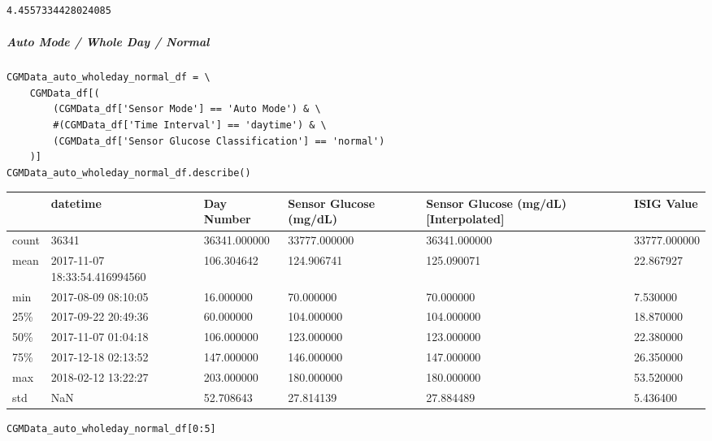 \begin{verbatim}
4.4557334428024085
\end{verbatim}

\subparagraph{Auto Mode / Whole Day / Normal}

\begin{verbatim}
CGMData_auto_wholeday_normal_df = \
    CGMData_df[(
        (CGMData_df['Sensor Mode'] == 'Auto Mode') & \
        #(CGMData_df['Time Interval'] == 'daytime') & \
        (CGMData_df['Sensor Glucose Classification'] == 'normal')
    )]
CGMData_auto_wholeday_normal_df.describe()
\end{verbatim}

\bigskip\noindent
\begin{tabular}{p{}p{}p{}p{}p{}p{}}
\toprule
 & datetime & Day Number & Sensor Glucose (mg/dL) & Sensor Glucose (mg/dL) [Interpolated] & ISIG Value \\
\hline
count & 36341 & 36341.000000 & 33777.000000 & 36341.000000 & 33777.000000 \\
\hline
mean & 2017-11-07 18:33:54.416994560 & 106.304642 & 124.906741 & 125.090071 & 22.867927 \\
\hline
min & 2017-08-09 08:10:05 & 16.000000 & 70.000000 & 70.000000 & 7.530000 \\
\hline
25\% & 2017-09-22 20:49:36 & 60.000000 & 104.000000 & 104.000000 & 18.870000 \\
\hline
50\% & 2017-11-07 01:04:18 & 106.000000 & 123.000000 & 123.000000 & 22.380000 \\
\hline
75\% & 2017-12-18 02:13:52 & 147.000000 & 146.000000 & 147.000000 & 26.350000 \\
\hline
max & 2018-02-12 13:22:27 & 203.000000 & 180.000000 & 180.000000 & 53.520000 \\
\hline
std & NaN & 52.708643 & 27.814139 & 27.884489 & 5.436400 \\
\hline
\bottomrule
\end{tabular}

\bigskip

\begin{verbatim}
CGMData_auto_wholeday_normal_df[0:5]
\end{verbatim}

